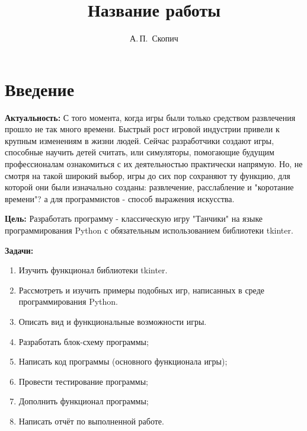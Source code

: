 \documentclass[14pt, oneside]{altsu-report}
\title{Название работы}
\author{А.\,П.~Скопич}
\institute{Институт цифровых технологий, электроники и физики}
\date{\the\year}
\begin{document}
\maketitle

\setcounter{page}{2}
\makeabstract
\tableofcontents

\chapter*{Введение}

\textbf{Актуальность: }
С того момента, когда игры были только средством развлечения прошло не так много времени. Быстрый рост игровой индустрии привели к крупным изменениям в жизни людей. Сейчас разработчики создают игры, способные научить детей считать, или симуляторы, помогающие будущим профессионалам ознакомиться с их деятельностью практически напрямую. Но, не смотря на такой широкий выбор, игры до сих пор сохраняют ту функцию, для которой они были изначально созданы: развлечение, расслабление и "коротание времени"? а для программистов - способ выражения искусства.

\textbf{Цель: }
Разработать программу - классическую игру "Танчики" на языке программирования Python с обязательным использованием библиотеки tkinter.

\textbf{Задачи:}
\begin{enumerate}
\item Изучить функционал библиотеки tkinter.
\item Рассмотреть и изучить примеры подобных игр, написанных в среде программирования Python.
\item Описать вид и функциональные возможности игры.
\item Разработать блок-схему программы;
\item Написать код программы (основного функционала игры);
\item Провести тестирование программы;
\item Дополнить функционал программы;
\item Написать отчёт по выполненной работе.
\end{enumerate}



\end{document}
